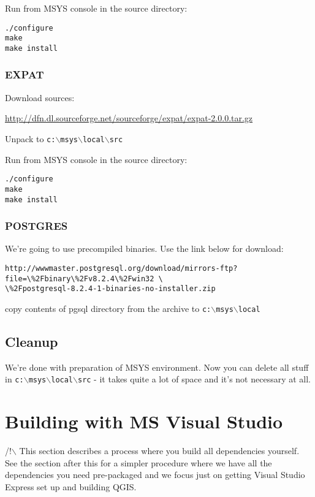 Run from MSYS console in the source directory:

\begin{verbatim}
./configure
make
make install
\end{verbatim}

\subsubsection{EXPAT}
Download sources:

\url{http://dfn.dl.sourceforge.net/sourceforge/expat/expat-2.0.0.tar.gz}

Unpack to \texttt{c:$\backslash$msys$\backslash$local$\backslash$src}

Run from MSYS console in the source directory:

\begin{verbatim}
./configure
make
make install
\end{verbatim}

\subsubsection{POSTGRES}
We're going to use precompiled binaries. Use the link below for download:

\begin{verbatim}
http://wwwmaster.postgresql.org/download/mirrors-ftp?file=\%2Fbinary\%2Fv8.2.4\%2Fwin32 \
\%2Fpostgresql-8.2.4-1-binaries-no-installer.zip
\end{verbatim}

copy contents of pgsql directory from the archive to \texttt{c:$\backslash$msys$\backslash$local}

\subsection{Cleanup}
We're done with preparation of MSYS environment. Now you can delete all stuff in \texttt{c:$\backslash$msys$\backslash$local$\backslash$src} - it takes quite a lot
of space and it's not necessary at all.


\section{Building with MS Visual Studio}
/!$\backslash$ This section describes a process where you build all dependencies yourself. See the section
after this for a simpler procedure where we have all the dependencies you need pre-packaged
and we focus just on getting Visual Studio Express set up and building QGIS.


